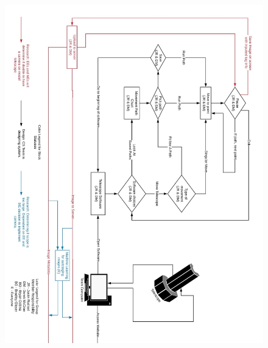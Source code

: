 \documentclass[12pt]{article}
\begin{document}
\begin{figure}[h]
	\centering
	\includegraphics[width=1.00\linewidth, height=17.0cm]{blockpt2}
\end{figure}

\newpage
\end{document}
